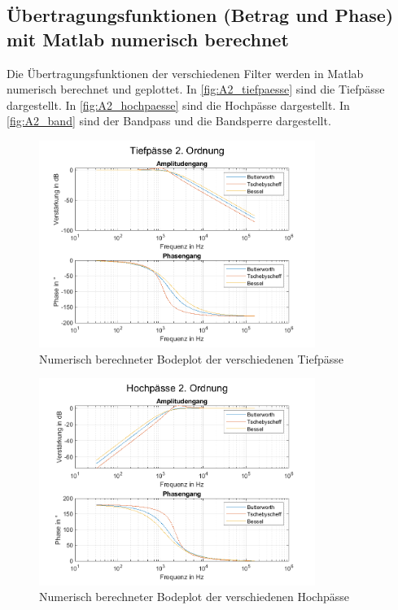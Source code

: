 
\subsection{Übertragungsfunktionen (Betrag und Phase) mit Matlab numerisch berechnet}

Die Übertragungsfunktionen der verschiedenen Filter werden in Matlab numerisch berechnet und geplottet. In \autoref{fig:A2_tiefpaesse} sind die Tiefpässe dargestellt. In \autoref{fig:A2_hochpaesse} sind die Hochpässe dargestellt. In \autoref{fig:A2_band} sind der Bandpass und die Bandsperre dargestellt.

\begin{figure}[H]
    \begin{center}
        \includegraphics[width=0.8\textwidth]{img/Aufgabe2_5_Tiefpaesse.png}
        \caption{Numerisch berechneter Bodeplot der verschiedenen Tiefpässe}
        \label{fig:A2_tiefpaesse}
    \end{center}
\end{figure}

\begin{figure}[H]
    \begin{center}
        \includegraphics[width=0.8\textwidth]{img/Aufgabe2_5_Hochpaesse.png}
        \caption{Numerisch berechneter Bodeplot der verschiedenen Hochpässe}
        \label{fig:A2_hochpaesse}
    \end{center}
\end{figure}

